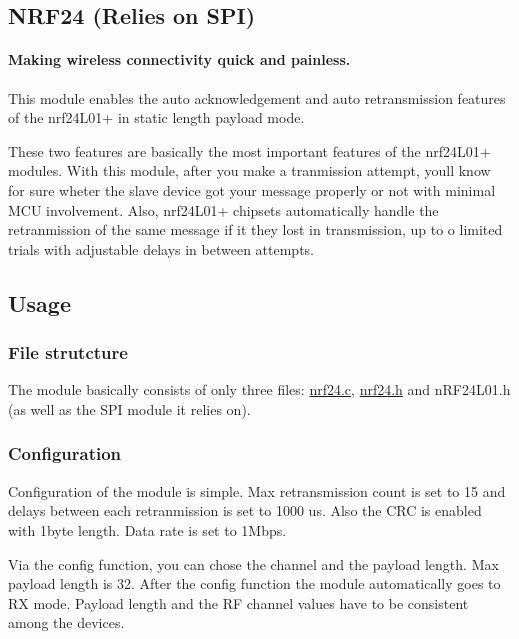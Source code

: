  \subsection*{N\+R\+F24 (Relies on S\+P\+I)}

\paragraph*{Making wireless connectivity quick and painless.}

This module enables the auto acknowledgement and auto retransmission features of the nrf24\+L01+ in static length payload mode.

These two features are basically the most important features of the nrf24\+L01+ modules. With this module, after you make a tranmission attempt, you\textquotesingle{}ll know for sure wheter the slave device got your message properly or not with minimal M\+C\+U involvement. Also, nrf24\+L01+ chipsets automatically handle the retranmission of the same message if it they lost in transmission, up to o limited trials with adjustable delays in between attempts.

\subsection*{Usage}

\subsubsection*{File strutcture}

The module basically consists of only three files\+: {\ttfamily \hyperlink{nrf24_8c}{nrf24.\+c}}, {\ttfamily \hyperlink{nrf24_8h}{nrf24.\+h}} and {\ttfamily n\+R\+F24\+L01.\+h} (as well as the S\+P\+I module it relies on).

\subsubsection*{Configuration}

Configuration of the module is simple. Max retransmission count is set to 15 and delays between each retranmission is set to 1000 us. Also the C\+R\+C is enabled with 1byte length. Data rate is set to 1\+Mbps.

Via the config function, you can chose the channel and the payload length. Max payload length is 32. After the config function the module automatically goes to R\+X mode. Payload length and the R\+F channel values have to be consistent among the devices.

